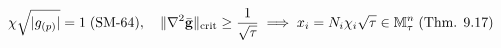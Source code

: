 \documentclass[preview]{standalone}
\begin{document}
\begin{align*}
\special{dvisvgm:raw <g id='unique000'>}\chi\sqrt{|g_{(p)}|} = 1\;(\text{SM-64}),\quad \|\nabla {}^2\bar{\mathbf{g}}\|_{\text{crit}} \ge \frac{1}{\sqrt{\tau}} \implies x_i = N_i\chi_i\sqrt{\tau} \in \mathbb{M}_\tau^n\;(\text{Thm. 9.17})\special{dvisvgm:raw </g>}
\end{align*}
\end{document}
